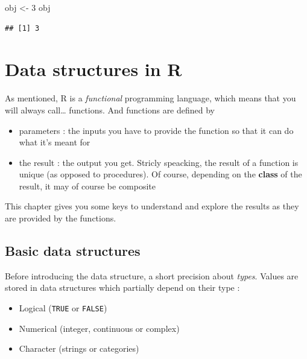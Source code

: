 \documentclass[
]{book}
\newenvironment{Shaded}{\begin{snugshade}}{\end{snugshade}}
\newcommand{\DecValTok}[1]{\textcolor[rgb]{0.00,0.00,0.81}{#1}}
\newcommand{\NormalTok}[1]{#1}
\newcommand{\StringTok}[1]{\textcolor[rgb]{0.31,0.60,0.02}{#1}}
\providecommand{\tightlist}{%
  \setlength{\itemsep}{0pt}\setlength{\parskip}{0pt}}
\begin{document}
\begin{Shaded}
\begin{Highlighting}[]
\NormalTok{obj <-}\StringTok{ }\DecValTok{3}
\NormalTok{obj}
\end{Highlighting}
\end{Shaded}

\begin{verbatim}
## [1] 3
\end{verbatim}

\hypertarget{data-structures-in-r}{%
\section{Data structures in R}\label{data-structures-in-r}}

As mentioned, R is a \emph{functional} programming language, which means that you will always call\ldots{} functions. And functions are defined by

\begin{itemize}
\tightlist
\item
  parameters : the inputs you have to provide the function so that it can do what it's meant for
\item
  the result : the output you get. Stricly speacking, the result of a function is unique (as opposed to procedures). Of course, depending on the \textbf{class} of the result, it may of course be composite
\end{itemize}

This chapter gives you some keys to understand and explore the results as they are provided by the functions.

\hypertarget{basic-data-structures}{%
\subsection{Basic data structures}\label{basic-data-structures}}

Before introducing the data structure, a short precision about \emph{types}. Values are stored in data structures which partially depend on their type :

\begin{itemize}
\tightlist
\item
  Logical (\texttt{TRUE} or \texttt{FALSE})
\item
  Numerical (integer, continuous or complex)
\item
  Character (strings or categories)
\end{itemize}
\end{document}

